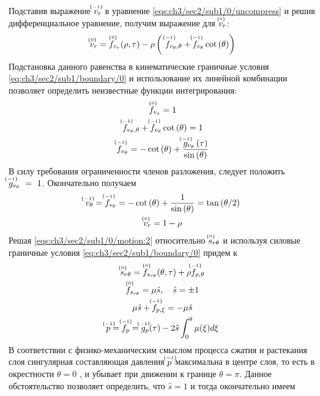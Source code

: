 Подставив выражение $\uindex{v}{-1}_{r}$ в уравнение \cref{eqs:ch3/sec2/sub1/0/uncompress} и решив дифференциальное уравнение, получим выражение для $\uindex{v}{0}_{r}$:
\begin{equation*}
  \uindex{v}{0}_{r} = \uindex{f}{0}_{v_{r}}(\rho, \tau) -\rho \left(\ \uindex{f}{-1}_{v_{\theta},\theta} + \uindex{f}{-1}_{v_{\theta}} \cot{\left(\theta\right)}\right)
\end{equation*}
Подстановка данного равенства в кинематические граничные условия \cref{eq:ch3/sec2/sub1/boundary/0} и использование их линейной комбинации позволяет определить неизвестные функции интегрирования:
\begin{gather*}
  \uindex{f}{0}_{v_{z}} = 1
  \\
  \uindex{f}{-1}_{v_{\theta},\theta} + \uindex{f}{-1}_{v_{\theta}} \cot{\left(\theta\right)} = 1
  \\
  \uindex{f}{-1}_{v_{\theta}} = -\cot{\left(\theta\right)} + \frac{\uindex{g}{-1}_{v_{\theta}}\left(\tau\right)}{\sin{\left(\theta\right)}}
\end{gather*}
В силу требования ограниченности членов разложения, следует положить $\uindex{g}{-1}_{v_{\theta}}~=~1$. Окончательно получаем
\begin{gather}
  \label{sol:ch3/sec2/sub1/vt/-1}
  \uindex{v}{-1}_{\theta} = \uindex{f}{-1}_{v_{\theta}} = -\cot{\left(\theta\right)} + \frac{1}{\sin{\left(\theta\right)}} = \tan{\left({\theta / 2}\right)}
  \\
  \label{sol:ch3/sec2/sub1/vr/0}
  \uindex{v}{0}_{r} =  1-\rho
\end{gather}
Решая \cref{eqs:ch3/sec2/sub1/0/motion:2} относительно $\uindex{s}{0}_{r\theta}$ и используя силовые граничные условия \cref{eq:ch3/sec2/sub1/boundary/0} придем к
\begin{gather*}
  \uindex{s}{0}_{r\theta} = \uindex{f}{0}_{s_{r\theta}}(\theta, \tau) + \rho  \uindex{f}{-1}_{p,\theta}
  \\
  \uindex{f}{0}_{s_{r\theta}} = \mu\hat{s}, \quad \hat{s} = \pm 1
  \\
  \mu\hat{s} + \uindex{f}{-1}_{p,\xi} = -\mu \hat{s}
  \\
  \uindex{p}{-1}=\uindex{f}{-1}_{p} =\uindex{g}{-1}_{p}(\tau) -2\hat{s}\int_0^{\theta}{\mu(\xi)d\xi}
\end{gather*}
В соответствии с физико-механическим смыслом процесса сжатия и растекания слоя сингулярная составляющая давления $\uindex{p}{-1}$ максимальна в центре слоя, то есть в окрестности $\theta = 0$ , и убывает при движении к границе $\theta=\pi$. Данное обстоятельство позволяет определить, что $\hat{s} = 1$ и тогда окончательно имеем
